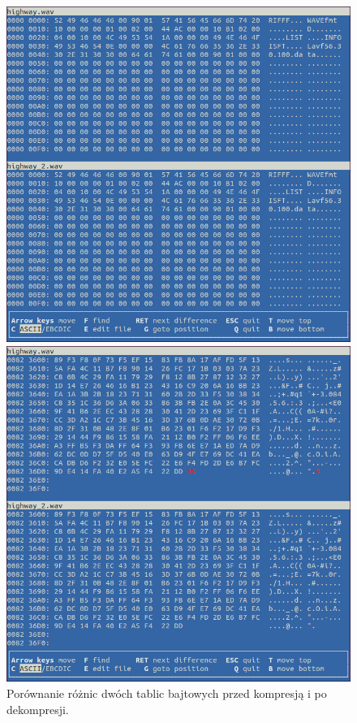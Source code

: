 \documentclass[12pt,a4paper,notitlepage]{report}
\begin{document}
\begin{figure}[H]
	\caption{Porównanie różnic dwóch tablic bajtowych przed kompresją i po dekompresji.}
	\centering
	\begin{minipage}{0.45\textwidth}
		\centering
		\includegraphics[scale=.3]{highway_beg}
	\end{minipage}\hfill
	\begin{minipage}{0.45\textwidth}
		\centering
		\includegraphics[scale=.3]{highway_end}
	\end{minipage}
\end{figure}
\end{document}
